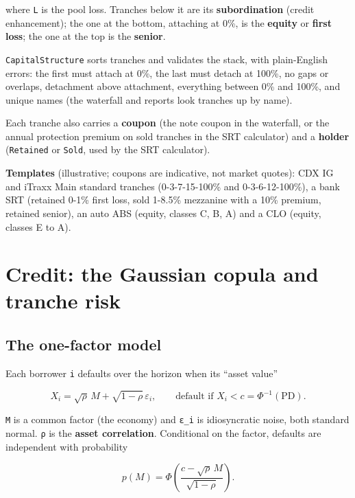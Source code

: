 \documentclass[10pt,a4paper]{article}
\numberwithin{equation}{section}
\begin{document}
where \texttt{L} is the pool loss. Tranches below it are its \textbf{subordination} (credit enhancement); the one at the bottom, attaching at 0\%, is the \textbf{equity} or \textbf{first loss}; the one at the top is the \textbf{senior}.

\texttt{CapitalStructure} sorts tranches and validates the stack, with plain-English errors: the first must attach at 0\%, the last must detach at 100\%, no gaps or overlaps, detachment above attachment, everything between 0\% and 100\%, and unique names (the waterfall and reports look tranches up by name).

Each tranche also carries a \textbf{coupon} (the note coupon in the waterfall, or the annual protection premium on sold tranches in the SRT calculator) and a \textbf{holder} (\texttt{Retained} or \texttt{Sold}, used by the SRT calculator).

\textbf{Templates} (illustrative; coupons are indicative, not market quotes): CDX IG and iTraxx Main standard tranches (0-3-7-15-100\% and 0-3-6-12-100\%), a bank SRT (retained 0-1\% first loss, sold 1-8.5\% mezzanine with a 10\% premium, retained senior), an auto ABS (equity, classes C, B, A) and a CLO (equity, classes E to A).

\section{Credit: the Gaussian copula and tranche risk}\label{credit-the-gaussian-copula-and-tranche-risk}

\subsection{The one-factor model}\label{the-one-factor-model}

Each borrower \texttt{i} defaults over the horizon when its ``asset value''

\begin{equation}
X_i=\sqrt{\rho}\,M+\sqrt{1-\rho}\,\varepsilon_i,\qquad
\text{default if }X_i<c=\Phi^{-1}(\mathrm{PD}).
\end{equation}

\texttt{M} is a common factor (the economy) and \texttt{ε\_i} is idiosyncratic noise, both standard normal. \texttt{ρ} is the \textbf{asset correlation}. Conditional on the factor, defaults are independent with probability

\begin{equation}
p(M)=\Phi\left(\frac{c-\sqrt{\rho}\,M}{\sqrt{1-\rho}}\right).
\end{equation}
\end{document}
